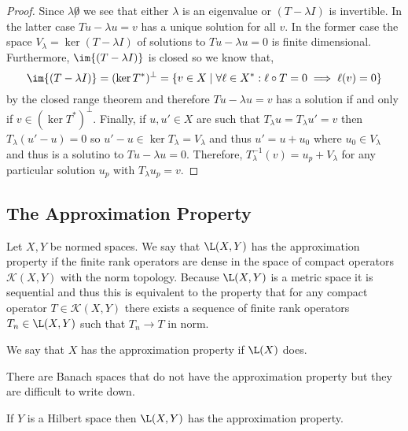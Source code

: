 \documentclass[12pt]{article}
\renewcommand{\K}{\mathbb{K}}
\renewcommand{\K}{\mathcal{K}}
\begin{document}
\begin{proof}
Since $\lambda \not 0$ we see that either $\lambda$ is an eigenvalue or $(T - \lambda I)$ is invertible. In the latter case $T u - \lambda u = v$ has a unique solution for all $v$. In the former case the space $V_\lambda = \ker{(T - \lambda I)}$ of solutions to $T u - \lambda u = 0$ is finite dimensional. Furthermore, $\im{(T - \lambda I)}$ is closed so we know that,
\[ \im{(T - \lambda I)} = (\ker{T^*})^\perp = \{ v \in X \mid \forall \ell \in X^* : \ell \circ T = 0 \implies \ell(v) = 0 \} \]
by the closed range theorem and therefore $T u - \lambda u = v$ has a solution if and only if $v \in (\ker{T^*})^\perp$. Finally, if $u, u' \in X$ are such that $T_\lambda u = T_\lambda u' = v$ then $T_\lambda (u' - u) = 0$ so $u' - u \in \ker{T_\lambda} = V_\lambda$ and thus $u' = u + u_0$ where $u_0 \in V_\lambda$ and thus is a solutino to $T u - \lambda u = 0$. Therefore, $T_\lambda^{-1}(v) = u_p + V_\lambda$ for any particular solution $u_p$ with $T_\lambda u_p = v$. 
\end{proof}

\subsection{The Approximation Property}

\begin{defn}
Let $X, Y$ be normed spaces. We say that $\L(X, Y)$ has the approximation property if the finite rank operators are dense in the space of compact operators $\K(X, Y)$ with the norm topology. Because $\L(X, Y)$ is a metric space it is sequential and thus this is equivalent to the property that for any compact operator $T \in \K(X, Y)$ there exists a sequence of finite rank operators $T_n \in \L(X, Y)$ such that $T_n \to T$ in norm.
\end{defn}

\begin{defn}
We say that $X$ has the approximation property if $\L(X)$ does.
\end{defn}

\begin{rmk}
There are Banach spaces that do not have the approximation property but they are difficult to write down.
\end{rmk}

\begin{prop}
If $Y$ is a Hilbert space then $\L(X, Y)$ has the approximation property.
\end{prop}
\end{document}
